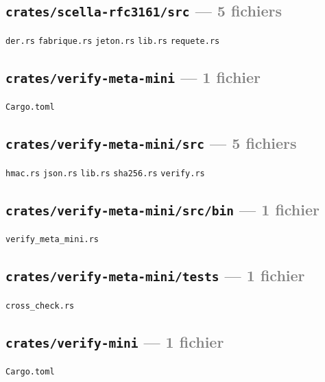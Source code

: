 \documentclass[10pt]{report}
\newcommand{\code}[1]{\texttt{\small #1}}
\begin{document}
\subsection*{\code{crates/scella-rfc3161/src} \normalfont\textcolor{grey}{--- 5 fichiers}}
\begin{sloppypar}\footnotesize\raggedright
\code{der.rs} \;\textbullet\; \code{fabrique.rs} \;\textbullet\; \code{jeton.rs} \;\textbullet\; \code{lib.rs} \;\textbullet\; \code{requete.rs}
\end{sloppypar}

\subsection*{\code{crates/verify-meta-mini} \normalfont\textcolor{grey}{--- 1 fichier}}
\begin{sloppypar}\footnotesize\raggedright
\code{Cargo.toml}
\end{sloppypar}

\subsection*{\code{crates/verify-meta-mini/src} \normalfont\textcolor{grey}{--- 5 fichiers}}
\begin{sloppypar}\footnotesize\raggedright
\code{hmac.rs} \;\textbullet\; \code{json.rs} \;\textbullet\; \code{lib.rs} \;\textbullet\; \code{sha256.rs} \;\textbullet\; \code{verify.rs}
\end{sloppypar}

\subsection*{\code{crates/verify-meta-mini/src/bin} \normalfont\textcolor{grey}{--- 1 fichier}}
\begin{sloppypar}\footnotesize\raggedright
\code{verify\_meta\_mini.rs}
\end{sloppypar}

\subsection*{\code{crates/verify-meta-mini/tests} \normalfont\textcolor{grey}{--- 1 fichier}}
\begin{sloppypar}\footnotesize\raggedright
\code{cross\_check.rs}
\end{sloppypar}

\subsection*{\code{crates/verify-mini} \normalfont\textcolor{grey}{--- 1 fichier}}
\begin{sloppypar}\footnotesize\raggedright
\code{Cargo.toml}
\end{sloppypar}
\end{document}
